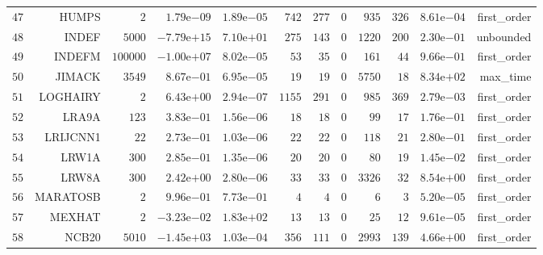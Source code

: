 \begin{longtable}{rrrrrrrrrrrr}
  \(    47\) & HUMPS & \(     2\) & \( 1.79\)e\(-09\) & \( 1.89\)e\(-05\) & \(   742\) & \(   277\) & \(     0\) & \(   935\) & \(   326\) & \( 8.61\)e\(-04\) & first\_order \\
  \(    48\) & INDEF & \(  5000\) & \(-7.79\)e\(+15\) & \( 7.10\)e\(+01\) & \(   275\) & \(   143\) & \(     0\) & \(  1220\) & \(   200\) & \( 2.30\)e\(-01\) & unbounded \\
  \(    49\) & INDEFM & \(100000\) & \(-1.00\)e\(+07\) & \( 8.02\)e\(-05\) & \(    53\) & \(    35\) & \(     0\) & \(   161\) & \(    44\) & \( 9.66\)e\(-01\) & first\_order \\
  \(    50\) & JIMACK & \(  3549\) & \( 8.67\)e\(-01\) & \( 6.95\)e\(-05\) & \(    19\) & \(    19\) & \(     0\) & \(  5750\) & \(    18\) & \( 8.34\)e\(+02\) & max\_time \\
  \(    51\) & LOGHAIRY & \(     2\) & \( 6.43\)e\(+00\) & \( 2.94\)e\(-07\) & \(  1155\) & \(   291\) & \(     0\) & \(   985\) & \(   369\) & \( 2.79\)e\(-03\) & first\_order \\
  \(    52\) & LRA9A & \(   123\) & \( 3.83\)e\(-01\) & \( 1.56\)e\(-06\) & \(    18\) & \(    18\) & \(     0\) & \(    99\) & \(    17\) & \( 1.76\)e\(-01\) & first\_order \\
  \(    53\) & LRIJCNN1 & \(    22\) & \( 2.73\)e\(-01\) & \( 1.03\)e\(-06\) & \(    22\) & \(    22\) & \(     0\) & \(   118\) & \(    21\) & \( 2.80\)e\(-01\) & first\_order \\
  \(    54\) & LRW1A & \(   300\) & \( 2.85\)e\(-01\) & \( 1.35\)e\(-06\) & \(    20\) & \(    20\) & \(     0\) & \(    80\) & \(    19\) & \( 1.45\)e\(-02\) & first\_order \\
  \(    55\) & LRW8A & \(   300\) & \( 2.42\)e\(+00\) & \( 2.80\)e\(-06\) & \(    33\) & \(    33\) & \(     0\) & \(  3326\) & \(    32\) & \( 8.54\)e\(+00\) & first\_order \\
  \(    56\) & MARATOSB & \(     2\) & \( 9.96\)e\(-01\) & \( 7.73\)e\(-01\) & \(     4\) & \(     4\) & \(     0\) & \(     6\) & \(     3\) & \( 5.20\)e\(-05\) & first\_order \\
  \(    57\) & MEXHAT & \(     2\) & \(-3.23\)e\(-02\) & \( 1.83\)e\(+02\) & \(    13\) & \(    13\) & \(     0\) & \(    25\) & \(    12\) & \( 9.61\)e\(-05\) & first\_order \\
  \(    58\) & NCB20 & \(  5010\) & \(-1.45\)e\(+03\) & \( 1.03\)e\(-04\) & \(   356\) & \(   111\) & \(     0\) & \(  2993\) & \(   139\) & \( 4.66\)e\(+00\) & first\_order \\

\end{longtable}
